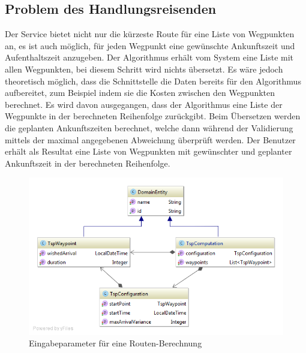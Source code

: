 \subsection{Problem des Handlungsreisenden}
Der Service bietet nicht nur die kürzeste Route für eine Liste von Wegpunkten an, es ist auch möglich, für jeden Wegpunkt eine gewünschte Ankunftszeit und Aufenthaltszeit anzugeben. Der 
Algorithmus erhält vom System eine Liste mit allen Wegpunkten, bei diesem Schritt wird nichts übersetzt. Es wäre jedoch theoretisch möglich, dass die Schnittstelle die Daten bereits für den 
Algorithmus aufbereitet, zum Beispiel indem sie die Kosten zwischen den Wegpunkten berechnet. Es wird davon ausgegangen, dass der Algorithmus eine Liste der Wegpunkte in der 
berechneten Reihenfolge zurückgibt. Beim Übersetzen werden die geplanten Ankunftszeiten berechnet, welche dann während der Validierung mittels der maximal angegebenen Abweichung 
überprüft werden. Der Benutzer erhält als Resultat eine Liste von Wegpunkten mit gewünschter und geplanter Ankunftszeit in der berechneten Reihenfolge.

\begin{figure}[h]
\centering
\includegraphics[scale=0.5]{images/probleme/tsp.png}
\caption[Eingabeparameter für eine Routen-Berechnung]{Eingabeparameter für eine Routen-Berechnung \selfmade{}}
\label{fig:tsp_input}
\end{figure}

%
%
%
%


